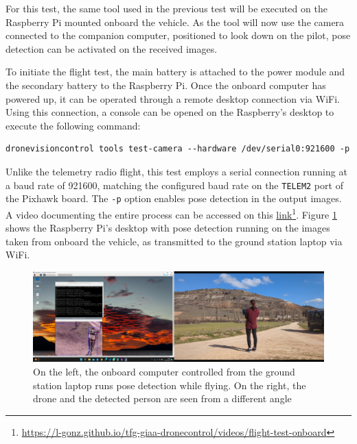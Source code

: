 For this test, the same tool used in the previous test will be executed on the Raspberry Pi mounted onboard the vehicle. As the tool will now use the camera connected to the companion computer, positioned to look down on the pilot, pose detection can be activated on the received images.

To initiate the flight test, the main battery is attached to the power module and the secondary battery to the Raspberry Pi. Once the onboard computer has powered up, it can be operated through a remote desktop connection via WiFi. Using this connection, a console can be opened on the Raspberry's desktop to execute the following command:
\begin{verbatim}
dronevisioncontrol tools test-camera --hardware /dev/serial0:921600 -p
\end{verbatim}


Unlike the telemetry radio flight, this test employs a serial connection running at a baud rate of 921600, matching the configured baud rate on the \texttt{TELEM2} port of the Pixhawk board. The \texttt{-p} option enables pose detection in the output images. A video documenting the entire process can be accessed on this \href{https://l-gonz.github.io/tfg-giaa-dronecontrol/videos/flight-test-onboard}{link}\footnote{\url{https://l-gonz.github.io/tfg-giaa-dronecontrol/videos/flight-test-onboard}}. Figure \ref{fig:flight-test-cam-onboard} shows the Raspberry Pi's desktop with pose detection running on the images taken from onboard the vehicle, as transmitted to the ground station laptop via WiFi.


\begin{figure}
  \centering
  \includegraphics[width=\textwidth, keepaspectratio]{img/video-field-test-onboard.png}
  \caption{On the left, the onboard computer controlled from the ground station laptop runs pose detection while flying. On the right, the drone and the detected person are seen from a different angle}
  \label{fig:flight-test-cam-onboard}
\end{figure}


